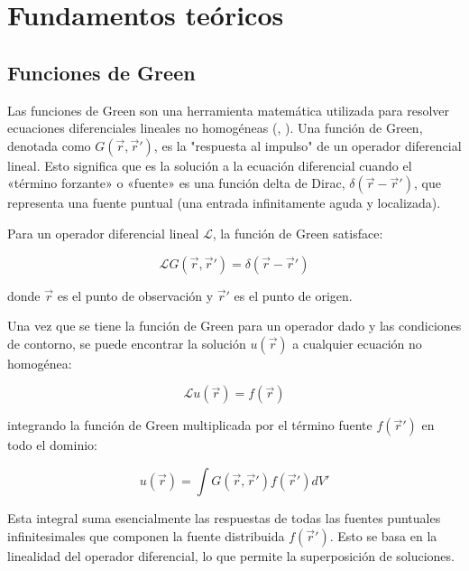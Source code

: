 \section{Fundamentos teóricos}

\subsection{Funciones de Green}\label{subsect:green}

Las funciones de Green son una herramienta matemática utilizada para resolver ecuaciones diferenciales lineales no homogéneas (\cite{morse_methods_1999}, \cite{farlow_partial_1993}). Una función de Green, denotada como $G(\vec{r}, \vec{r}')$, es la "respuesta al impulso" de un operador diferencial lineal. Esto significa que es la solución a la ecuación diferencial cuando el «término forzante» o «fuente» es una función delta de Dirac, $\delta(\vec{r} - \vec{r}')$, que representa una fuente puntual (una entrada infinitamente aguda y localizada).

Para un operador diferencial lineal $\mathcal{L}$, la función de Green satisface:

\begin{equation}\label{ec:green_diferencial}
    \mathcal{L} G(\vec{r}, \vec{r}') = \delta(\vec{r} - \vec{r}')
\end{equation}

donde $\vec{r}$ es el punto de observación y $\vec{r}'$ es el punto de origen.

Una vez que se tiene la función de Green para un operador dado y las condiciones de contorno, se puede encontrar la solución $u(\vec{r})$ a cualquier ecuación no homogénea:

\begin{equation}
    \mathcal{L} u(\vec{r}) = f(\vec{r})
\end{equation}

integrando la función de Green multiplicada por el término fuente $f(\vec{r}')$ en todo el dominio:

\begin{equation}
    u(\vec{r}) = \int G(\vec{r}, \vec{r}') f(\vec{r}') dV'
\end{equation}

Esta integral suma esencialmente las respuestas de todas las fuentes puntuales infinitesimales que componen la fuente distribuida $f(\vec{r}')$. Esto se basa en la linealidad del operador diferencial, lo que permite la superposición de soluciones.


